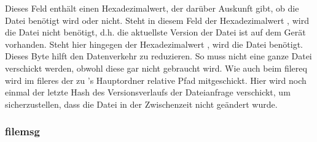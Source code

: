 \begin{description}
		Dieses Feld enthält einen Hexadezimalwert, der darüber Auskunft gibt, ob die Datei benötigt wird oder nicht. Steht in diesem Feld der Hexadezimalwert , wird die Datei nicht benötigt, d.h. die aktuellste Version der Datei ist auf dem Gerät vorhanden. Steht hier hingegen der Hexadezimalwert , wird die Datei benötigt. Dieses Byte hilft den Datenverkehr zu reduzieren. So muss nicht eine ganze Datei verschickt werden, obwohl diese gar nicht gebraucht wird.
		Wie auch beim \gls{filereq} wird im \gls{fileres} der zu \sblit's Hauptordner relative Pfad mitgeschickt.
		Hier wird noch einmal der letzte Hash des Versionsverlaufs der Dateianfrage verschickt, um sicherzustellen, dass die Datei in der Zwischenzeit nicht geändert wurde. 
\end{description}
		
\subsubsection{\gls{filemsg}}
\messagestart
	 \\
	
	\begin{rightwordgroup}{\isprotomsgtype}
	\end{rightwordgroup} \\
	
	\begin{rightwordgroup}{\isprotomsgdata}
		 \\
		\skippedwords \\
		 \\
		 \\
		\skippedwords \\
		 \\
		 \\
		\skippedwords \\
		 \\
		 \\
		\skippedwords \\
	\end{rightwordgroup}
	
